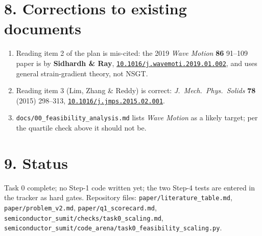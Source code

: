 \documentclass[11pt]{article}
\newcommand{\doi}[1]{\href{https://doi.org/#1}{\texttt{#1}}}
\begin{document}
\section*{8. Corrections to existing documents}
\begin{enumerate}\small
\item Reading item 2 of the plan is mis-cited: the 2019 \emph{Wave Motion} \textbf{86} 91--109 paper
is by \textbf{Sidhardh \& Ray}, \doi{10.1016/j.wavemoti.2019.01.002}, and uses general strain-gradient
theory, not NSGT.
\item Reading item 3 (Lim, Zhang \& Reddy) is correct: \emph{J.\ Mech.\ Phys.\ Solids}
\textbf{78} (2015) 298--313, \doi{10.1016/j.jmps.2015.02.001}.
\item \texttt{docs/00\_feasibility\_analysis.md} lists \emph{Wave Motion} as a likely target; per the
quartile check above it should not be.
\end{enumerate}

\section*{9. Status}
Task 0 complete; no Step-1 code written yet; the two Step-4 tests are entered in the tracker as
hard gates. Repository files: \texttt{paper/literature\_table.md},
\texttt{paper/problem\_v2.md}, \texttt{paper/q1\_scorecard.md},
\texttt{semiconductor\_sumit/checks/task0\_scaling.md}, \texttt{semiconductor\_sumit/code\_arena/task0\_feasibility\_scaling.py}.
\end{document}
